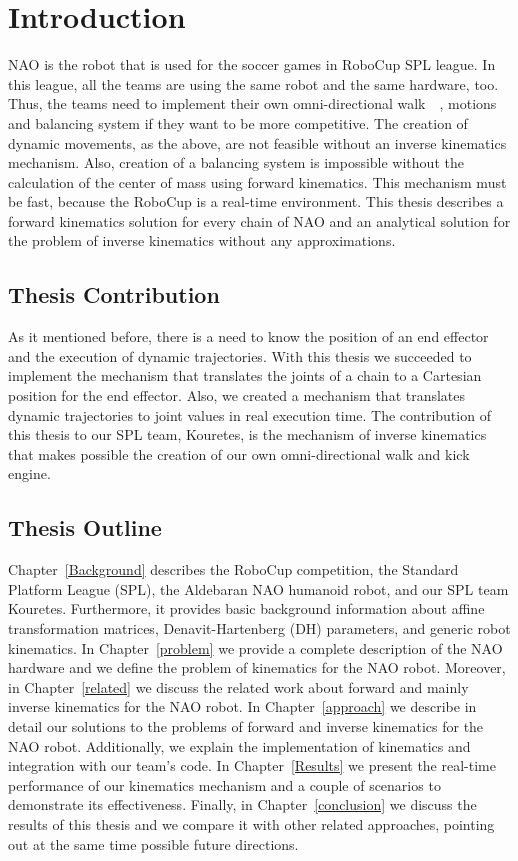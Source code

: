 \chapter{Introduction}
\label{intro}
NAO is the robot that is used for the soccer games in RoboCup SPL league. In this league, all the teams are using the same robot and the same hardware, too. Thus, the teams need to implement their own omni-directional walk~\cite{naowalk}~\cite{bhumanwalk}, motions and balancing system if they want to be more competitive. The creation of dynamic movements, as the above, are not feasible without an inverse kinematics mechanism. Also, creation of a balancing system is impossible without the calculation of the center of mass using forward kinematics. This mechanism must be fast, because the RoboCup is a real-time environment. This thesis describes a forward kinematics solution for every chain of NAO and an analytical solution for the problem of inverse kinematics without any approximations.

\section{Thesis Contribution}
As it mentioned before, there is a need to know the position of an end effector and the execution of dynamic trajectories. With this thesis we succeeded to implement the mechanism that translates the joints of a chain to a Cartesian position for the end effector. Also, we created a mechanism that translates dynamic trajectories to joint values in real execution time. The contribution of this thesis to our SPL team, Kouretes, is the mechanism of inverse kinematics that makes possible the creation of our own omni-directional walk and kick engine.

\section{Thesis Outline}
Chapter~\ref{Background} describes the RoboCup competition, the Standard Platform League (SPL), the Aldebaran NAO humanoid robot, and our SPL team Kouretes. Furthermore, it provides basic background information about affine transformation matrices, Denavit-Hartenberg (DH) parameters, and generic robot kinematics. In Chapter~\ref{problem} we provide a complete description of the NAO hardware and we define the problem of kinematics for the NAO robot. Moreover, in Chapter~\ref{related} we discuss the related work about forward and mainly inverse kinematics for the NAO robot. In Chapter~\ref{approach} we describe in detail our solutions to the problems of forward and inverse kinematics for the NAO robot. Additionally, we explain the implementation of kinematics and integration with our team's code. In Chapter~\ref{Results} we present the real-time performance of our kinematics mechanism and a couple of scenarios to demonstrate its effectiveness. Finally, in Chapter~\ref{conclusion} we discuss the results of this thesis and we compare it with other related approaches, pointing out at the same time possible future directions.

